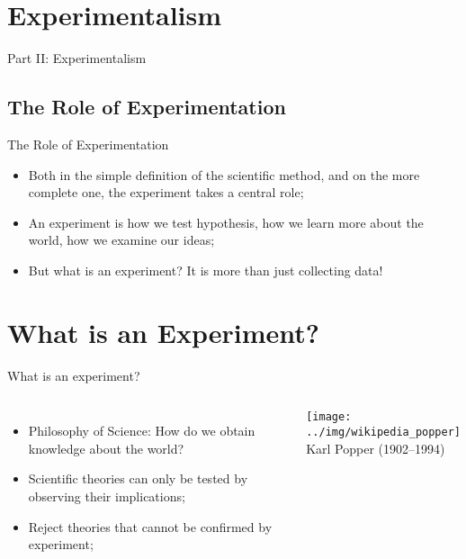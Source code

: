 
\section{Experimentalism}
\begin{frame}
  \begin{center}
    Part II: Experimentalism
  \end{center}
\end{frame}

\subsection{The Role of Experimentation}
\begin{frame}{The Role of Experimentation}
  \begin{itemize}
    \item Both in the simple definition of the scientific method, and on the more complete one, the experiment takes a central role;
    \bigskip

    \item An experiment is how we test hypothesis, how we learn more about the world, how we examine our ideas;
    \bigskip

    \item But what is an experiment? It is more than just collecting data!
  \end{itemize}
\end{frame}


\section{What is an Experiment?}
\begin{frame}{What is an experiment?}
  \begin{columns}[t]
    \begin{itemize}
      \item Philosophy of Science: How do we obtain knowledge about the world?
      \bigskip

      \item Scientific theories can only be tested by observing their implications;
      \bigskip

      \item Reject theories that cannot be confirmed by experiment;
    \end{itemize}

    \texttt{[image: ../img/wikipedia\_popper]}\\
    Karl Popper (1902--1994)
  \end{columns}
\end{frame}


